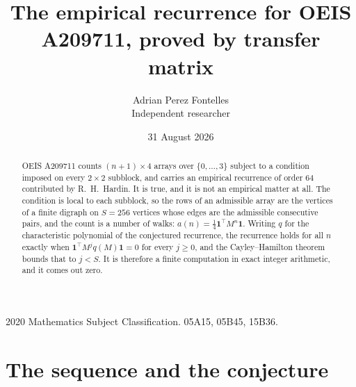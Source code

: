 \documentclass[11pt,a4paper]{article}
\title{The empirical recurrence for OEIS A209711, proved by transfer matrix}
\author{Adrian Perez Fontelles\\ \small Independent researcher}
\date{31 August 2026}
\theoremstyle{plain}
\theoremstyle{definition}
\begin{document}
\maketitle

\begin{abstract}
OEIS A209711 counts $(n+1)\times4$ arrays over $\{0,\dots,3\}$ subject to a condition imposed on
every $2\times2$ subblock, and carries an empirical recurrence of order $64$ contributed
by R.~H.~Hardin. It is true, and it is not an empirical matter at all. The condition is local
to each subblock, so the rows of an admissible array are the vertices of a finite digraph
on $S=256$ vertices whose edges are the admissible consecutive pairs, and the count is a
number of walks: $a(n)=\tfrac1{4}\mathbf{1}^{\!\top}M^{n}\mathbf{1}$. Writing $q$
for the characteristic polynomial of the conjectured recurrence, the recurrence holds for all
$n$ exactly when $\mathbf{1}^{\!\top}M^{j}q(M)\mathbf{1}=0$ for every $j\ge0$, and the
Cayley--Hamilton theorem bounds that to $j<S$. It is therefore a finite computation in exact
integer arithmetic, and it comes out zero.
\end{abstract}

\noindent\small 2020 Mathematics Subject Classification. 05A15, 05B45, 15B36.\normalsize

\section{The sequence and the conjecture}
\end{document}
